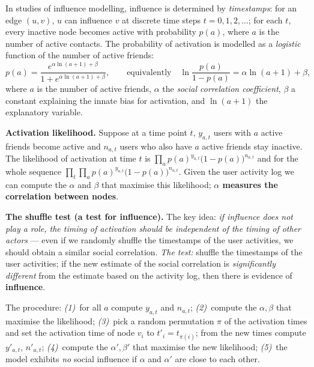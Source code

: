 \documentclass[11pt,a4paper]{article}
\theoremstyle{definition}
\begin{document}
\begin{defbox}
In studies of influence modelling, influence is determined by \emph{timestamps}: for an edge $(u,v)$,
$u$ can influence $v$ at discrete time steps $t=0,1,2,\dots$; for each $t$, every inactive node
becomes active with probability $p(a)$, where $a$ is the number of active contacts. The probability of
activation is modelled as a \emph{logistic} function of the number of active friends:
\[ p(a)=\frac{e^{\alpha\ln(a+1)+\beta}}{1+e^{\alpha\ln(a+1)+\beta}},\qquad\text{equivalently}\quad
   \ln\frac{p(a)}{1-p(a)}=\alpha\ln(a+1)+\beta, \]
where $a$ is the number of active friends, $\alpha$ the \emph{social correlation coefficient},
$\beta$ a constant explaining the innate bias for activation, and $\ln(a+1)$ the explanatory
variable.

\textbf{Activation likelihood.} Suppose at a time point $t$, $y_{a,t}$ users with $a$ active friends
become active and $n_{a,t}$ users who also have $a$ active friends stay inactive. The likelihood of
activation at time $t$ is $\prod_a p(a)^{y_{a,t}}\big(1-p(a)\big)^{n_{a,t}}$ and for the whole
sequence $\prod_t\prod_a p(a)^{y_{a,t}}\big(1-p(a)\big)^{n_{a,t}}$. Given the user activity log we
can compute the $\alpha$ and $\beta$ that maximise this likelihood; \textbf{$\alpha$ measures the
correlation between nodes}.

\textbf{The shuffle test (a test for influence).} The key idea: \emph{if influence does not play a
role, the timing of activation should be independent of the timing of other actors} --- even if we
randomly shuffle the timestamps of the user activities, we should obtain a similar social
correlation. \emph{The test:} shuffle the timestamps of the user activities; if the new estimate of
the social correlation is \emph{significantly different} from the estimate based on the activity log,
then there is evidence of \textbf{influence}.

The procedure: \emph{(1)}~for all $a$ compute $y_{a,t}$ and $n_{a,t}$; \emph{(2)}~compute the
$\alpha,\beta$ that maximise the likelihood; \emph{(3)}~pick a random permutation $\pi$ of the
activation times and set the activation time of node $v_i$ to $t'_i=t_{\pi(i)}$; from the new times
compute $y'_{a,t}$, $n'_{a,t}$; \emph{(4)}~compute the $\alpha',\beta'$ that maximise the new
likelihood; \emph{(5)}~the model exhibits \emph{no} social influence if $\alpha$ and $\alpha'$ are
close to each other.
\end{defbox}
\end{document}
